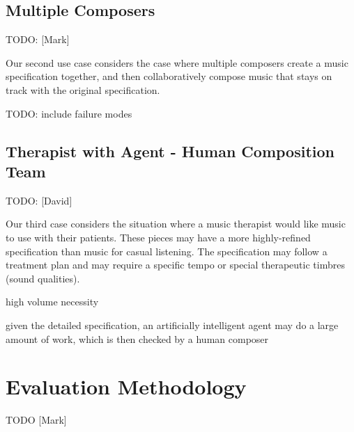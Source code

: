 \documentclass[final,authoryear,11pt,times]{elsarticle}
\begin{document}
\subsection{Multiple Composers}
TODO: [Mark]

Our second use case considers the case where multiple composers create a music specification together, and then collaboratively compose music that stays on track with the original specification.

TODO: include failure modes

\subsection{Therapist with Agent - Human Composition Team}

TODO: [David]

Our third case considers the situation where a music therapist would like music to use with their patients. These pieces may have a more highly-refined specification than music for casual listening. The specification may follow a treatment plan and may require a specific tempo or special therapeutic timbres (sound qualities).

high volume necessity

given the detailed specification, an artificially intelligent agent may do a large amount of work, which is then checked by a human composer

\section{Evaluation Methodology}

TODO [Mark]


\end{document}
